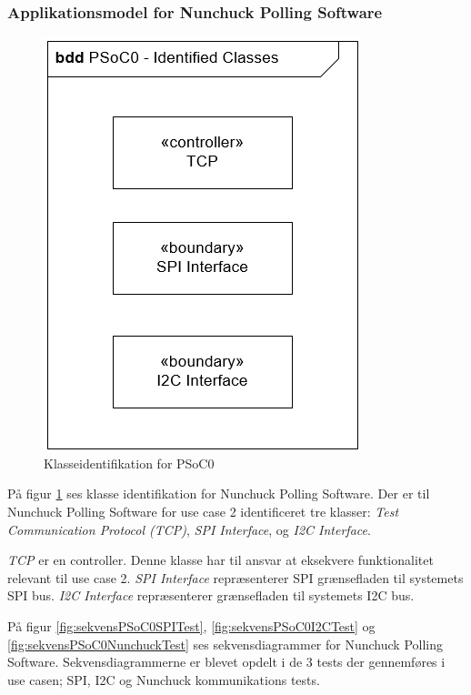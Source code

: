 \subsubsection{Applikationsmodel for Nunchuck Polling Software}

\begin{figure}[H]
	\centering
	\includegraphics[scale=0.8]{Systemarkitektur/images/KlasseIdentifikationPSoC0.png}
	\caption{Klasseidentifikation for PSoC0}
	\label{fig:klasseidentifikationPSoC}
\end{figure}

På figur \ref{fig:klasseidentifikationPSoC} ses klasse identifikation for Nunchuck Polling Software. Der er til Nunchuck Polling Software for use case 2 identificeret tre klasser: \textit{Test Communication Protocol (TCP)}, \textit{SPI Interface}, og \textit{I2C Interface}.

\textit{TCP} er en controller. Denne klasse har til ansvar at eksekvere funktionalitet relevant til use case 2. \textit{SPI Interface} repræsenterer SPI grænsefladen til systemets SPI bus. \textit{I2C Interface} repræsenterer grænsefladen til systemets I2C bus.

På figur \ref{fig:sekvensPSoC0SPITest}, \ref{fig:sekvensPSoC0I2CTest} og \ref{fig:sekvensPSoC0NunchuckTest} ses sekvensdiagrammer for Nunchuck Polling Software. Sekvensdiagrammerne er blevet opdelt i de 3 tests der gennemføres i use casen; SPI, I2C og Nunchuck kommunikations tests.

